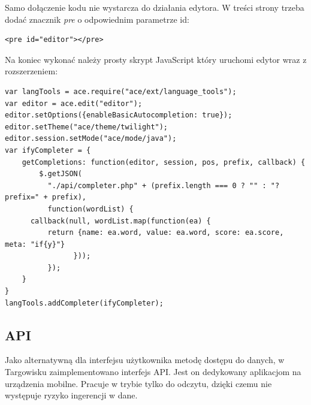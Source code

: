 \documentclass[11pt,a4paper,polish,thesis]{dcsbook}
\begin{document}
Samo dołączenie kodu nie wystarcza do działania edytora. W treści strony trzeba dodać znacznik \emph{pre} o odpowiednim parametrze id:
\begin{verbatim}
<pre id="editor"></pre>
\end{verbatim}

Na koniec wykonać należy prosty skrypt JavaScript który uruchomi edytor wraz z rozszerzeniem:
\begin{verbatim}
var langTools = ace.require("ace/ext/language_tools");
var editor = ace.edit("editor");
editor.setOptions({enableBasicAutocompletion: true});
editor.setTheme("ace/theme/twilight");
editor.session.setMode("ace/mode/java");
var ifyCompleter = {
    getCompletions: function(editor, session, pos, prefix, callback) {
        $.getJSON(
          "./api/completer.php" + (prefix.length === 0 ? "" : "?prefix=" + prefix),
          function(wordList) {
      callback(null, wordList.map(function(ea) {
          return {name: ea.word, value: ea.word, score: ea.score, meta: "if{y}"}
                }));
          });
    }
}
langTools.addCompleter(ifyCompleter);
\end{verbatim}
\subsection{API}
Jako alternatywną dla interfejsu użytkownika metodę dostępu do danych, w Targowisku zaimplementowano interfejs API. Jest on dedykowany aplikacjom na urządzenia mobilne.
Pracuje w trybie tylko do odczytu, dzięki czemu nie występuje ryzyko ingerencji w dane.
\end{document}
